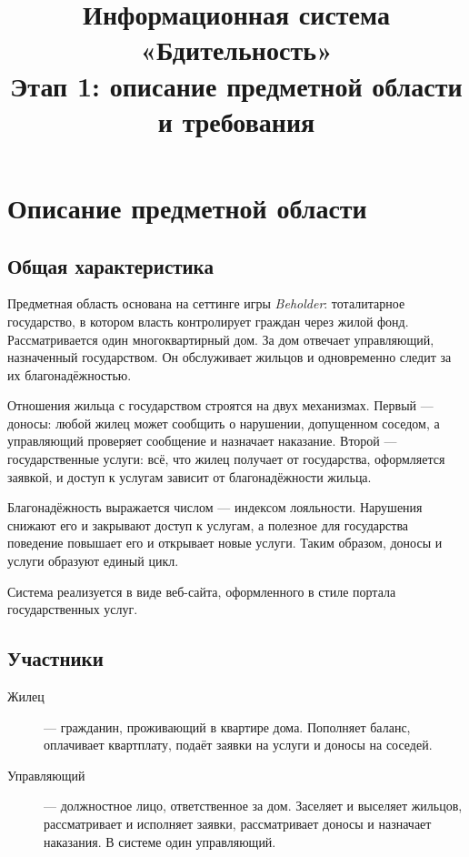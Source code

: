 \documentclass[12pt,a4paper]{article}
\title{Информационная система «Бдительность»\\[4pt]
\large Этап 1: описание предметной области и требования}
\author{}
\date{}
\begin{document}
\maketitle
\tableofcontents
\newpage

\section{Описание предметной области}

\subsection{Общая характеристика}

Предметная область основана на сеттинге игры \emph{Beholder}: тоталитарное
государство, в котором власть контролирует граждан через жилой фонд.
Рассматривается один многоквартирный дом. За дом отвечает управляющий,
назначенный государством. Он обслуживает жильцов и одновременно следит за
их благонадёжностью.

Отношения жильца с государством строятся на двух механизмах. Первый ---
доносы: любой жилец может сообщить о нарушении, допущенном соседом, а
управляющий проверяет сообщение и назначает наказание. Второй ---
государственные услуги: всё, что жилец получает от государства, оформляется
заявкой, и доступ к услугам зависит от благонадёжности жильца.

Благонадёжность выражается числом --- индексом лояльности. Нарушения
снижают его и закрывают доступ к услугам, а полезное для государства
поведение повышает его и открывает новые услуги. Таким образом, доносы и
услуги образуют единый цикл.

Система реализуется в виде веб-сайта, оформленного в стиле портала
государственных услуг.

\subsection{Участники}

\begin{description}
  \item[Жилец] --- гражданин, проживающий в квартире дома. Пополняет
    баланс, оплачивает квартплату, подаёт заявки на услуги и доносы на
    соседей.
  \item[Управляющий] --- должностное лицо, ответственное за дом. Заселяет
    и выселяет жильцов, рассматривает и исполняет заявки, рассматривает
    доносы и назначает наказания. В системе один управляющий.
\end{description}
\end{document}
